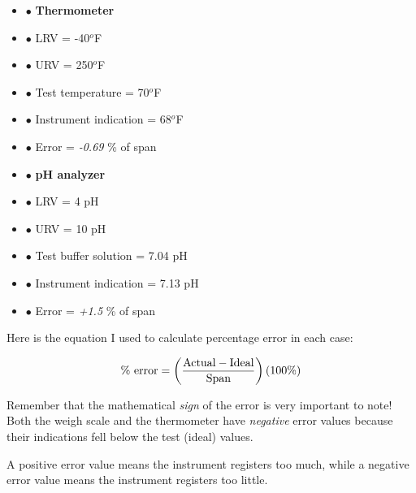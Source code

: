 \vskip 10pt

\begin{itemize}
\item{$\bullet$} {\bf Thermometer}
\item{$\bullet$} LRV = -40$^{o}$F
\item{$\bullet$} URV = 250$^{o}$F
\item{$\bullet$} Test temperature = 70$^{o}$F
\item{$\bullet$} Instrument indication = 68$^{o}$F
\item{$\bullet$} Error = {\it -0.69} \% of span
\medskip
\end{itemize}

\vskip 10pt

\begin{itemize}
\item{$\bullet$} {\bf pH analyzer}
\item{$\bullet$} LRV = 4 pH
\item{$\bullet$} URV = 10 pH
\item{$\bullet$} Test buffer solution = 7.04 pH
\item{$\bullet$} Instrument indication = 7.13 pH
\item{$\bullet$} Error = {\it +1.5} \% of span
\medskip
\end{itemize}







Here is the equation I used to calculate percentage error in each case:

$$\hbox{\% error} = \left({\hbox{Actual} - \hbox{Ideal} \over \hbox{Span}}\right) (100 \%)$$

Remember that the mathematical {\it sign} of the error is very important to note!  Both the weigh scale and the thermometer have {\it negative} error values because their indications fell below the test (ideal) values.

A positive error value means the instrument registers too much, while a negative error value means the instrument registers too little.




